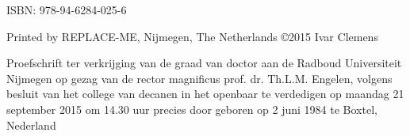 \begin{titlepage}

\fontsize{12pt}{14pt}\selectfont

\qquad

\fontsize{17.28pt}{21pt}\selectfont

\noindent \concept{\thesistitle}
\fontsize{15.28pt}{20pt}\selectfont
 \npar \noindent \thesissubtitle

\fontsize{12pt}{14pt}\selectfont

\vspace{1cm}

\noindent {}

\vspace{3cm}

\end{titlepage}



\clearpage

\null
\vspace*{\fill}
\noindent ISBN: 978-94-6284-025-6

\npar
\noindent Printed by REPLACE-ME, Nijmegen, The Netherlands
\npar
\noindent \copyright 2015 Ivar Clemens

\clearpage



\begin{center}

\fontsize{17.28pt}{21pt}\selectfont

{\textsc{\MakeUppercase{\thesistitle}}}
 \npar \MakeUppercase{\thesissubtitle}

\fontsize{12pt}{14pt}\selectfont

\vspace{1cm}
Proefschrift
\vspace{1cm}
\npar
ter verkrijging van de graad van doctor
\npar
aan de Radboud Universiteit Nijmegen
\npar
op gezag van de rector magnificus prof. dr. Th.L.M. Engelen,
\npar
volgens besluit van het college van decanen
\npar
in het openbaar te verdedigen op maandag 21 september 2015
\npar
om 14.30 uur precies
\npar
\vspace{1cm}
door
\npar
\vspace{1cm}
\npar
geboren op 2 juni 1984
\npar
te Boxtel, Nederland

\vspace{2.8cm}

\fontsize{17.28pt}{21pt}\selectfont
\end{center}


